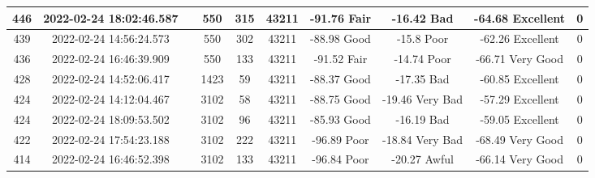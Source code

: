 \begin{longtable*}{|c|c|c|c|c|c|c|c|c|c|}
446&2022-02-24 18:02:46.587&&550&315&43211& -91.76    Fair        & -16.42    Bad         & -64.68    Excellent   & 0\\\hline
{}439&2022-02-24 14:56:24.573&&550&302&43211& -88.98    Good        & -15.8     Poor        & -62.26    Excellent   & 0\\\hline
{}436&2022-02-24 16:46:39.909&&550&133&43211& -91.52    Fair        & -14.74    Poor        & -66.71    Very Good   & 0\\\hline
{}428&2022-02-24 14:52:06.417&&1423&59&43211& -88.37    Good        & -17.35    Bad         & -60.85    Excellent   & 0\\\hline
{}424&2022-02-24 14:12:04.467&&3102&58&43211& -88.75    Good        & -19.46    Very Bad    & -57.29    Excellent   & 0\\\hline
{}424&2022-02-24 18:09:53.502&&3102&96&43211& -85.93    Good        & -16.19    Bad         & -59.05    Excellent   & 0\\\hline
{}422&2022-02-24 17:54:23.188&&3102&222&43211& -96.89    Poor        & -18.84    Very Bad    & -68.49    Very Good   & 0\\\hline
{}414&2022-02-24 16:46:52.398&&3102&133&43211& -96.84    Poor        & -20.27    Awful       & -66.14    Very Good   & 0\\\hline

\end{longtable*}
